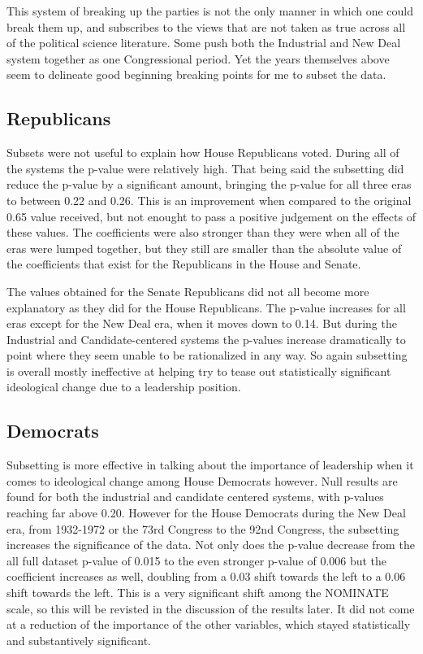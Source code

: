 \documentclass[12pt,twoside]{reedthesis}
\begin{document}
  This system of breaking up the parties is not the only manner in which
  one could break them up, and subscribes to the views that are not taken
  as true across all of the political science literature. Some push both
  the Industrial and New Deal system together as one Congressional period.
  Yet the years themselves above seem to delineate good beginning breaking
  points for me to subset the data.
  
  \subsection{Republicans}\label{republicans-1}
  
  Subsets were not useful to explain how House Republicans voted. During
  all of the systems the p-value were relatively high. That being said the
  subsetting did reduce the p-value by a significant amount, bringing the
  p-value for all three eras to between 0.22 and 0.26. This is an
  improvement when compared to the original 0.65 value received, but not
  enought to pass a positive judgement on the effects of these values. The
  coefficients were also stronger than they were when all of the eras were
  lumped together, but they still are smaller than the absolute value of
  the coefficients that exist for the Republicans in the House and Senate.
  
  The values obtained for the Senate Republicans did not all become more
  explanatory as they did for the House Republicans. The p-value increases
  for all eras except for the New Deal era, when it moves down to 0.14.
  But during the Industrial and Candidate-centered systems the p-values
  increase dramatically to point where they seem unable to be rationalized
  in any way. So again subsetting is overall mostly ineffective at helping
  try to tease out statistically significant ideological change due to a
  leadership position.
  
  \subsection{Democrats}\label{democrats-1}
  
  Subsetting is more effective in talking about the importance of
  leadership when it comes to ideological change among House Democrats
  however. Null results are found for both the industrial and candidate
  centered systems, with p-values reaching far above 0.20. However for the
  House Democrats during the New Deal era, from 1932-1972 or the 73rd
  Congress to the 92nd Congress, the subsetting increases the significance
  of the data. Not only does the p-value decrease from the all full
  dataset p-value of 0.015 to the even stronger p-value of 0.006 but the
  coefficient increases as well, doubling from a 0.03 shift towards the
  left to a 0.06 shift towards the left. This is a very significant shift
  among the NOMINATE scale, so this will be revisted in the discussion of
  the results later. It did not come at a reduction of the importance of
  the other variables, which stayed statistically and substantively
  significant.
  
\end{document}
